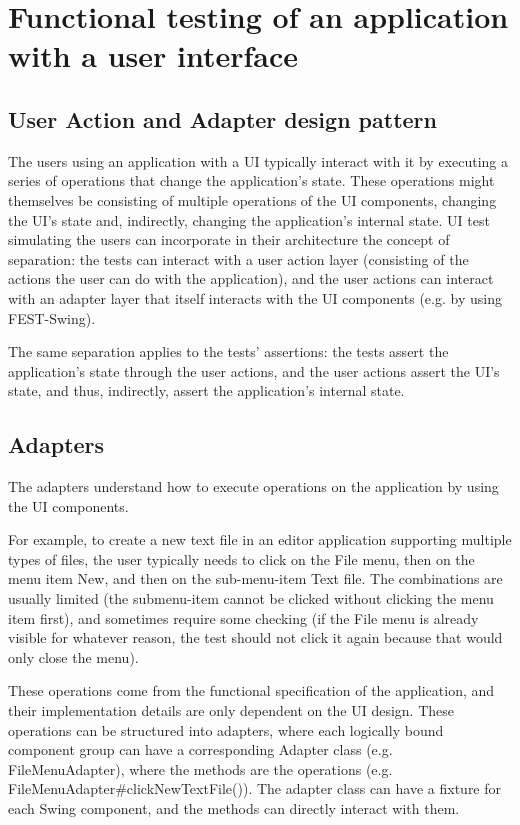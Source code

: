 \section{Functional testing of an application with a user interface}\label{sec:theory_functional-ui-testing}

\subsection{User Action and Adapter design pattern}\label{sec:user-actions-adapters}

The users using an application with a UI typically interact with it by executing a series of operations that change the application's state. These operations might themselves be consisting of multiple operations of the UI components, changing the UI's state and, indirectly, changing the application's internal state. UI test simulating the users can incorporate in their architecture the concept of separation: the tests can interact with a user action layer (consisting of the actions the user can do with the application), and the user actions can interact with an adapter layer that itself interacts with the UI components (e.g. by using FEST-Swing).

The same separation applies to the tests' assertions: the tests assert the application's state through the user actions, and the user actions assert the UI's state, and thus, indirectly, assert the application's internal state.

\subsection{Adapters}

The adapters understand how to execute operations on the application by using the UI components. 

For example, to create a new text file in an editor application supporting multiple types of files, the user typically needs to click on the File menu, then on the menu item New, and then on the sub-menu-item Text file. The combinations are usually limited (the submenu-item cannot be clicked without clicking the menu item first), and sometimes require some checking (if the File menu is already visible for whatever reason, the test should not click it again because that would only close the menu).

These operations come from the functional specification of the application, and their implementation details are only dependent on the UI design. These operations can be structured into adapters, where each logically bound component group can have a corresponding Adapter class (e.g. FileMenuAdapter), where the methods are the operations (e.g. FileMenuAdapter\#clickNewTextFile()). The adapter class can have a fixture for each Swing component, and the methods can directly interact with them.

